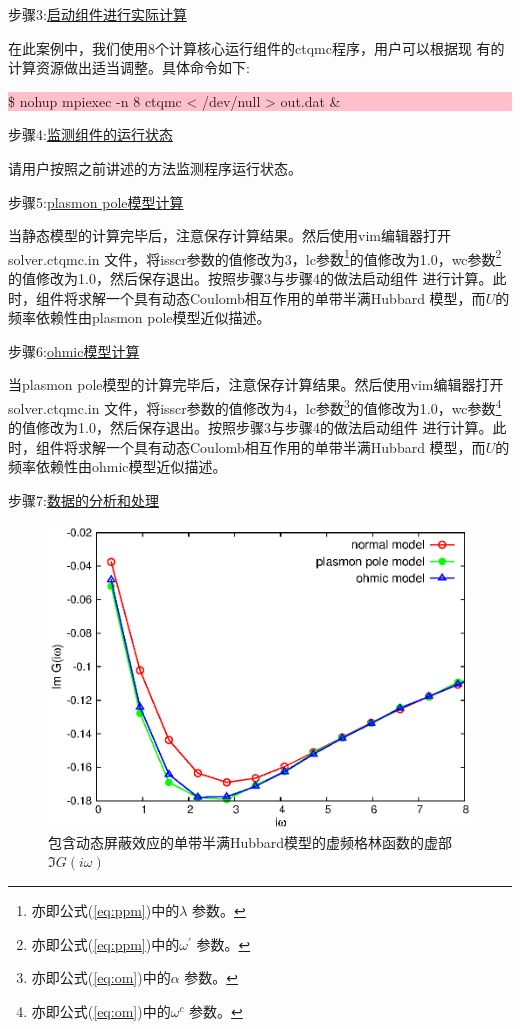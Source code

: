 步骤3:\underline{启动{\narcissus}组件进行实际计算}

在此案例中，我们使用8个计算核心运行{\narcissus}组件的ctqmc程序，用户可以根据现
有的计算资源做出适当调整。具体命令如下:

\noindent\colorbox{pink}{\parbox[r]{\linewidth}{\quad \$ nohup mpiexec -n 8 ctqmc < /dev/null >  out.dat \&}}

步骤4:\underline{监测{\narcissus}组件的运行状态}

请用户按照之前讲述的方法监测程序运行状态。

步骤5:\underline{plasmon pole模型计算}

当静态模型的计算完毕后，注意保存计算结果。然后使用vim编辑器打开solver.ctqmc.in
文件，将isscr参数的值修改为3，lc参数\footnote{亦即公式(\ref{eq:ppm})中的$\lambda$
参数。}的值修改为1.0，wc参数\footnote{亦即公式(\ref{eq:ppm})中的$\omega^{\prime}$
参数。}的值修改为1.0，然后保存退出。按照步骤3与步骤4的做法启动{\narcissus}组件
进行计算。此时，{\narcissus}组件将求解一个具有动态Coulomb相互作用的单带半满Hubbard
模型，而$U$的频率依赖性由plasmon pole模型近似描述。

步骤6:\underline{ohmic模型计算}

当plasmon pole模型的计算完毕后，注意保存计算结果。然后使用vim编辑器打开solver.ctqmc.in
文件，将isscr参数的值修改为4，lc参数\footnote{亦即公式(\ref{eq:om})中的$\alpha$
参数。}的值修改为1.0，wc参数\footnote{亦即公式(\ref{eq:om})中的$\omega^{c}$
参数。}的值修改为1.0，然后保存退出。按照步骤3与步骤4的做法启动{\narcissus}组件
进行计算。此时，{\narcissus}组件将求解一个具有动态Coulomb相互作用的单带半满Hubbard
模型，而$U$的频率依赖性由ohmic模型近似描述。

步骤7:\underline{数据的分析和处理}

\begin{figure}
\centering
\includegraphics{figure/scr-grn.eps}
\caption{包含动态屏蔽效应的单带半满Hubbard模型的虚频格林函数的虚部$\Im G(i\omega)$} 
\label{fig:scr-grn}
\end{figure}

